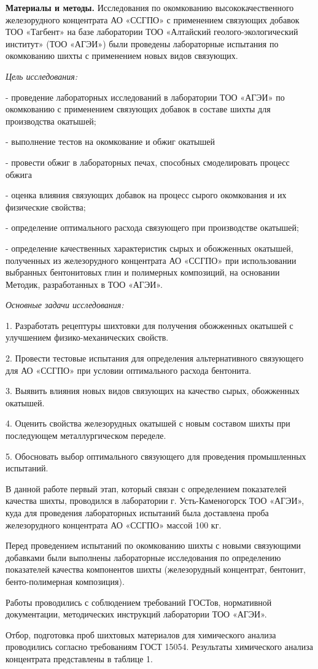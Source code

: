 \begin{multicols}{2}
{\bfseries Материалы и методы.} Исследования по окомкованию
высококачественного железорудного концентрата АО «ССГПО» с применением
связующих добавок ТОО «Тагбент» на базе лаборатории ТОО «Алтайский
геолого-экологический институт» (ТОО «АГЭИ») были проведены лабораторные
испытания по окомкованию шихты с применением новых видов связующих.

\emph{Цель исследования:}

- проведение лабораторных исследований в лаборатории ТОО «АГЭИ» по
окомкованию с применением связующих добавок в составе шихты для
производства окатышей;

- выполнение тестов на окомкование и обжиг окатышей

- провести обжиг в лабораторных печах, способных смоделировать процесс
обжига

- оценка влияния связующих добавок на процесс сырого окомкования и их
физические свойства;

- определение оптимального расхода связующего при производстве окатышей;

- определение качественных характеристик сырых и обожженных окатышей,
полученных из железорудного концентрата АО «ССГПО» при использовании
выбранных бентонитовых глин и полимерных композиций, на основании
Методик, разработанных в ТОО «АГЭИ».

\emph{Основные задачи исследования:}

1. Разработать рецептуры шихтовки для получения обожженных окатышей с
улучшением физико-механических свойств.

2. Провести тестовые испытания для определения альтернативного связующего
для АО «ССГПО» при условии оптимального расхода бентонита.

3. Выявить влияния новых видов связующих на качество сырых, обожженных
окатышей.

4. Оценить свойства железорудных окатышей с новым составом шихты при
последующем металлургическом переделе.

5. Обосновать выбор оптимального связующего для проведения промышленных
испытаний.

В данной работе первый этап, который связан с определением показателей
качества шихты, проводился в лаборатории г. Усть-Каменогорск ТОО «АГЭИ»,
куда для проведения лабораторных испытаний была доставлена проба
железорудного концентрата АО «ССГПО» массой 100 кг.

Перед проведением испытаний по окомкованию шихты с новыми связующими
добавками были выполнены лабораторные исследования по определению
показателей качества компонентов шихты (железорудный концентрат,
бентонит, бенто-полимерная композиция).

Работы проводились с соблюдением требований ГОСТов, нормативной
документации, методических инструкций лаборатории ТОО «АГЭИ».

Отбор, подготовка проб шихтовых материалов для химического анализа
проводились согласно требованиям ГОСТ 15054. Результаты химического
анализа концентрата представлены в таблице 1.
\end{multicols}

